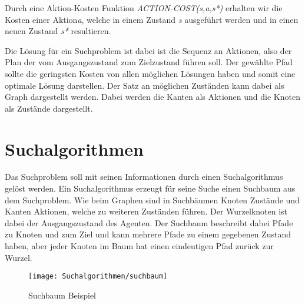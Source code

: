 Durch eine Aktion-Kosten Funktion \textit{ACTION-COST(s,a,s*)} erhalten wir die Kosten einer Aktion\textit{a}, welche in einem Zustand \textit{s} ausgeführt werden und in einen neuen Zustand \textit{s*} resultieren.

Die Lösung für ein Suchproblem ist dabei ist die Sequenz an Aktionen, also der Plan der vom Ausgangszustand zum Zielzustand führen soll. Der gewählte Pfad sollte die geringsten Kosten von allen möglichen Lösungen haben und somit eine optimale Lösung darstellen. Der Satz an möglichen Zuständen kann dabei als Graph dargestellt werden. Dabei werden die Kanten als Aktionen und die Knoten als Zustände dargestellt.

\section{Suchalgorithmen}
Das Suchproblem soll mit seinen Informationen durch einen Suchalgorithmus gelöst werden. Ein Suchalgorithmus erzeugt für seine Suche einen Suchbaum aus dem Suchproblem. Wie beim Graphen sind in Suchbäumen Knoten Zustände und Kanten Aktionen, welche zu weiteren Zuständen führen. Der Wurzelknoten ist dabei der Ausgangszustand des Agenten. Der Suchbaum beschreibt dabei Pfade zu Knoten und zum Ziel und kann mehrere Pfade zu einem gegebenen Zustand haben, aber jeder Knoten im Baum hat einen eindeutigen Pfad zurück zur Wurzel.

\begin{figure}[h]
  \centering
  \texttt{[image: Suchalgorithmen/suchbaum]}
  \caption{Suchbaum Beispiel}
\end{figure}

